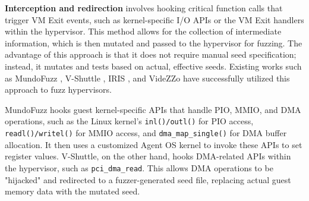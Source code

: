 

\textbf{Interception and redirection } involves hooking critical function calls that trigger VM Exit events, such as kernel-specific I/O APIs or the VM Exit handlers within the hypervisor. This method allows for the collection of intermediate information, which is then mutated and passed to the hypervisor for fuzzing. The advantage of this approach is that it does not require manual seed specification; instead, it mutates and tests based on actual, effective seeds. Existing works such as MundoFuzz \cite{myung2022mundofuzz}, V-Shuttle \cite{pan2021V-shuttle}, IRIS \cite{cesarano2023iris}, and VideZZo \cite{Liu2023ViDeZZoDV} have successfully utilized this approach to fuzz hypervisors.

MundoFuzz hooks guest kernel-specific APIs that handle PIO, MMIO, and DMA operations, such as the Linux kernel's \texttt{inl()/outl()} for PIO access, \texttt{readl()/writel()} for MMIO access, and \texttt{dma\_map\_single()} for DMA buffer allocation. It then uses a customized Agent OS kernel to invoke these APIs to set register values. V-Shuttle, on the other hand, hooks DMA-related APIs within the hypervisor, such as \texttt{pci\_dma\_read}. This allows DMA operations to be "hijacked" and redirected to a fuzzer-generated seed file, replacing actual guest memory data with the mutated seed.

